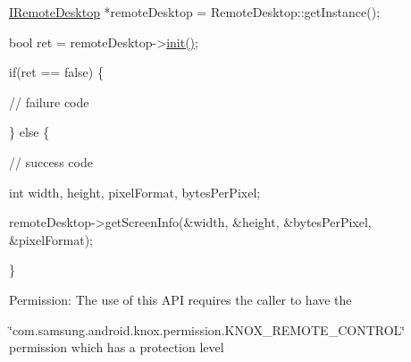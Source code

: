 \begin{DoxyPre}  \hyperlink{classknoxremotedesktop_1_1IRemoteDesktop}{IRemoteDesktop} *remoteDesktop = RemoteDesktop::getInstance();\end{DoxyPre}



\begin{DoxyPre}  bool ret = remoteDesktop->\hyperlink{classknoxremotedesktop_1_1IRemoteDesktop_a7bed40d98c61713a69cf1dad8b37beae}{init()};\end{DoxyPre}



\begin{DoxyPre}  if(ret == false)  \{\end{DoxyPre}



\begin{DoxyPre}     // failure code\end{DoxyPre}



\begin{DoxyPre}  \} else \{\end{DoxyPre}



\begin{DoxyPre}     // success code\end{DoxyPre}



\begin{DoxyPre}     int	width, height, pixelFormat, bytesPerPixel;\end{DoxyPre}



\begin{DoxyPre}     remoteDesktop->getScreenInfo(&width, &height, &bytesPerPixel, &pixelFormat);\end{DoxyPre}



\begin{DoxyPre}  \}\end{DoxyPre}



\begin{DoxyPre} \end{DoxyPre}


\begin{DoxyParagraph}{\-Permission\-: }
\-The use of this \-A\-P\-I requires the caller to have the
\end{DoxyParagraph}
\char`\"{}com.\-samsung.\-android.\-knox.\-permission.\-K\-N\-O\-X\-\_\-\-R\-E\-M\-O\-T\-E\-\_\-\-C\-O\-N\-T\-R\-O\-L\char`\"{} permission which has a protection level

